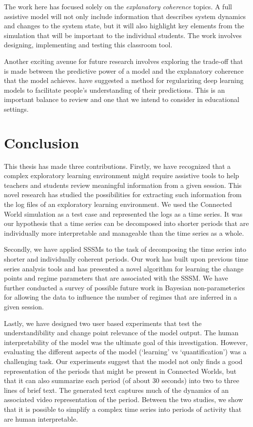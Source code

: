 The work here has focused solely on the \textit{explanatory coherence} topics. A full assistive model will not only include information that describes system dynamics and changes to the system state, but it will also highlight key elements from the simulation that will be important to the individual students. The work involves designing, implementing and testing this classroom tool.

Another exciting avenue for future research involves exploring the trade-off that is made between the predictive power of a model and the explanatory coherence that the model achieves. \cite{wu2017beyond} have suggested a method for regularizing deep learning models to facilitate people's understanding of their predictions. This is an important balance to review and one that we intend to consider in educational settings.

\section{Conclusion}

This thesis has made three contributions. Firstly, we have recognized that a complex exploratory learning environment might require assistive tools to help teachers and students review meaningful information from a given session. This novel research has studied the possibilities for extracting such information from the log files of an exploratory learning environment. We used the Connected World simulation as a test case and represented the logs as a time series. It was our hypothesis that a time series can be decomposed into shorter periods that are individually more interpretable and manageable than the time series as a whole.

Secondly, we have applied SSSMs to the task of decomposing the time series into shorter and individually coherent periods. Our work has built upon previous time series analysis tools and has presented a novel algorithm for learning the change points and regime parameters that are associated with the SSSM. We have further conducted a survey of possible future work in Bayesian non-parameterics for allowing the data to influence the number of regimes that are inferred in a given session.

Lastly, we have designed two user based experiments that test the understandibility and change point relevance of the model output. The human interpretability of the model was the ultimate goal of this investigation. However, evaluating the different aspects of the model (`learning' vs `quantification') was a challenging task. Our experiments suggest that the model not only finds a good representation of the periods that might be present in Connected Worlds, but that it can also summarize each period (of about 30 seconds) into two to three lines of brief text. The generated text captures much of the dynamics of an associated video representation of the period. Between the two studies, we show that it is possible to simplify a complex time series into periods of activity that are human interpretable.

